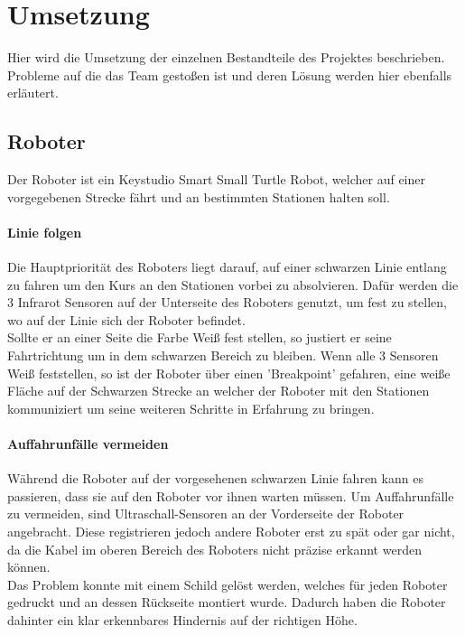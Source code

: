 \chapter{Umsetzung}
Hier wird die Umsetzung der einzelnen Bestandteile des Projektes beschrieben. Probleme auf die das Team gestoßen ist und deren Lösung werden hier ebenfalls erläutert.

\section{Roboter}
Der Roboter ist ein Keystudio Smart Small Turtle Robot, welcher auf einer vorgegebenen Strecke fährt und an bestimmten Stationen halten soll.
\subsubsection{Linie folgen}
Die Hauptpriorität des Roboters liegt darauf, auf einer schwarzen Linie entlang zu fahren um den Kurs an den Stationen vorbei zu absolvieren. Dafür werden die 3 Infrarot Sensoren auf der Unterseite des Roboters genutzt, um fest zu stellen, wo auf der Linie sich der Roboter befindet.\\
Sollte er an einer Seite die Farbe Weiß fest stellen, so justiert er seine Fahrtrichtung um in dem schwarzen Bereich zu bleiben. Wenn alle 3 Sensoren Weiß feststellen, so ist der Roboter über einen 'Breakpoint' gefahren, eine weiße Fläche auf der Schwarzen Strecke an welcher der Roboter mit den Stationen kommuniziert um seine weiteren Schritte in Erfahrung zu bringen.

\subsubsection{Auffahrunfälle vermeiden}
Während die Roboter auf der vorgesehenen schwarzen Linie fahren kann es passieren, dass sie auf den Roboter vor ihnen warten müssen. Um Auffahrunfälle zu vermeiden, sind Ultraschall-Sensoren an der Vorderseite der Roboter angebracht. Diese registrieren jedoch andere Roboter erst zu spät oder gar nicht, da die Kabel im oberen Bereich des Roboters nicht präzise erkannt werden können. \\
Das Problem konnte mit einem Schild gelöst werden, welches für jeden Roboter gedruckt und an dessen Rückseite montiert wurde. Dadurch haben die Roboter dahinter ein klar erkennbares Hindernis auf der richtigen Höhe.

